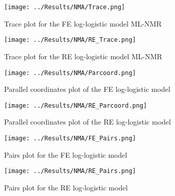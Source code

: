 \begin{figure}[h]
    \centering
    \begin{minipage}[b]{0.45\textwidth}
        \centering
        \texttt{[image: ../Results/NMA/Trace.png]}
        \caption{Trace plot for the FE log-logistic model ML-NMR}
        \label{fig:tracebcFE}
    \end{minipage}
    \hspace{0.05\textwidth}
    \begin{minipage}[b]{0.45\textwidth}
        \centering
        \texttt{[image: ../Results/NMA/RE\_Trace.png]}
        \caption{Trace plot for the RE log-logistic model ML-NMR}
        \label{fig:tracebcRE}
    \end{minipage}
\end{figure}

\begin{figure}[h]
    \centering
    \begin{minipage}[b]{0.45\textwidth}
        \centering
        \texttt{[image: ../Results/NMA/Parcoord.png]}
        \caption{Parallel coordinates plot of the FE log-logistic model}
        \label{fig:parcoord}
    \end{minipage}
    \hspace{0.05\textwidth}
    \begin{minipage}[b]{0.45\textwidth}
        \centering
        \texttt{[image: ../Results/NMA/RE\_Parcoord.png]}
        \caption{Parallel coordinates plot of the RE log-logistic model}
        \label{fig:RE_parcoord}
    \end{minipage}
\end{figure}

\begin{figure}[h]
    \centering
    \texttt{[image: ../Results/NMA/FE\_Pairs.png]}
    \caption{Pairs plot for the FE log-logistic model}
    \label{fig:pairs}
\end{figure}

\begin{figure}[h]
    \centering
    \texttt{[image: ../Results/NMA/RE\_Pairs.png]}
    \caption{Pairs plot for the RE log-logistic model}
    \label{fig:RE_pairs}
\end{figure}


